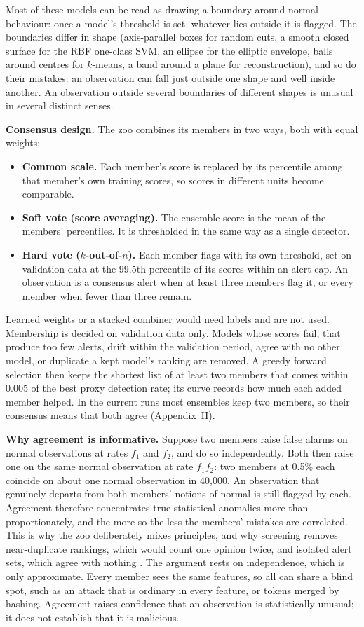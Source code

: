 \documentclass[11pt,a4paper]{article}
\begin{document}
Most of these models can be read as drawing a boundary around normal behaviour: once a model's threshold is set, whatever lies outside it is flagged. The boundaries differ in shape (axis-parallel boxes for random cuts, a smooth closed surface for the RBF one-class SVM, an ellipse for the elliptic envelope, balls around centres for \(k\)-means, a band around a plane for reconstruction), and so do their mistakes: an observation can fall just outside one shape and well inside another. An observation outside several boundaries of different shapes is unusual in several distinct senses.

\textbf{Consensus design.} The zoo combines its members in two ways, both with equal weights:
\begin{itemize}[leftmargin=*]
\item \textbf{Common scale.} Each member's score is replaced by its percentile among that member's own training scores, so scores in different units become comparable.
\item \textbf{Soft vote (score averaging).} The ensemble score is the mean of the members' percentiles. It is thresholded in the same way as a single detector.
\item \textbf{Hard vote (\(k\)-out-of-\(n\)).} Each member flags with its own threshold, set on validation data at the 99.5th percentile of its scores within an alert cap. An observation is a consensus alert when at least three members flag it, or every member when fewer than three remain.
\end{itemize}
Learned weights or a stacked combiner would need labels and are not used. Membership is decided on validation data only. Models whose scores fail, that produce too few alerts, drift within the validation period, agree with no other model, or duplicate a kept model's ranking are removed. A greedy forward selection then keeps the shortest list of at least two members that comes within 0.005 of the best proxy detection rate; its curve records how much each added member helped. In the current runs most ensembles keep two members, so their consensus means that both agree (Appendix~H).

\textbf{Why agreement is informative.} Suppose two members raise false alarms on normal observations at rates \(f_1\) and \(f_2\), and do so independently. Both then raise one on the same normal observation at rate \(f_1f_2\): two members at 0.5\% each coincide on about one normal observation in 40,000. An observation that genuinely departs from both members' notions of normal is still flagged by each. Agreement therefore concentrates true statistical anomalies more than proportionately, and the more so the less the members' mistakes are correlated. This is why the zoo deliberately mixes principles, and why screening removes near-duplicate rankings, which would count one opinion twice, and isolated alert sets, which agree with nothing \cite{ref21,ref20}. The argument rests on independence, which is only approximate. Every member sees the same features, so all can share a blind spot, such as an attack that is ordinary in every feature, or tokens merged by hashing. Agreement raises confidence that an observation is statistically unusual; it does not establish that it is malicious.
\end{document}
